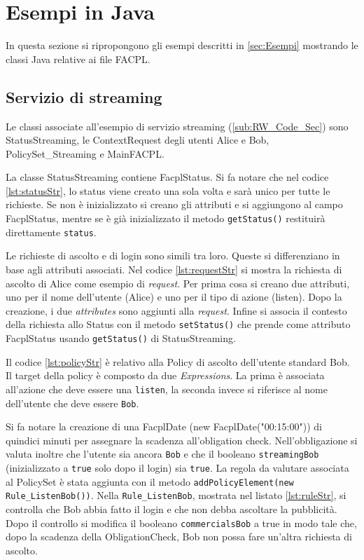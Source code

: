 \section{Esempi in Java}
\label{sec:Esempi in Java}
In questa sezione si ripropongono gli esempi descritti in \ref{sec:Esempi} mostrando le classi Java relative
ai file FACPL.
\subsection{Servizio di streaming}
\label{sub:EsStreamingJava}
Le classi associate all'esempio di servizio streaming (\ref{sub:RW_Code_Sec})
sono StatusStreaming, le ContextRequest degli utenti Alice e Bob, PolicySet\_Streaming e MainFACPL.

La classe StatusStreaming contiene FacplStatus. Si fa notare che nel codice \ref{lst:statusStr},
lo status viene creato una sola volta e sarà unico per tutte le richieste. Se non è inizializzato
si creano gli attributi e si aggiungono al campo FacplStatus, mentre se è già inizializzato il metodo
\texttt{getStatus()} restituirà direttamente \texttt{status}.

Le richieste di ascolto e di login sono simili tra loro. Queste si differenziano in base agli attributi associati.
Nel codice \ref{lst:requestStr} si mostra la richiesta di ascolto di Alice come esempio di \emph{request}.
Per prima cosa si creano due attributi, uno per il nome dell'utente (Alice) e uno per il tipo di azione (listen).
Dopo la creazione, i due \emph{attributes} sono aggiunti alla \emph{request}. Infine si associa il contesto della
richiesta allo Status con il metodo \texttt{setStatus()} che prende come attributo FacplStatus usando \texttt{getStatus()}
di StatusStreaming. \par
{}

Il codice \ref{lst:policyStr} è relativo alla Policy di ascolto dell'utente standard Bob.
Il target della policy è composto da due \emph{Expressions}. La prima è associata all'azione che deve essere una \texttt{listen},
la seconda invece si riferisce al nome dell'utente che deve essere \texttt{Bob}.\par
Si fa notare la creazione di una FacplDate (new FacplDate("00:15:00")) di quindici minuti per assegnare la scadenza all'obligation check.
Nell'obbligazione si valuta inoltre che l'utente sia ancora \texttt{Bob} e che il booleano
\texttt{streamingBob} (inizializzato a \texttt{true} solo dopo il login) sia \texttt{true}.
La regola da valutare associata al PolicySet è stata aggiunta con il metodo
\texttt{addPolicyElement(new Rule\_ListenBob())}.
Nella \texttt{Rule\_ListenBob}, mostrata nel listato \ref{lst:ruleStr}, si controlla che Bob abbia fatto il login e che
non debba ascoltare la pubblicità. Dopo il controllo si modifica il booleano \texttt{commercialsBob} a true in modo tale
che, dopo la scadenza della ObligationCheck, Bob non possa fare un'altra richiesta di ascolto.

